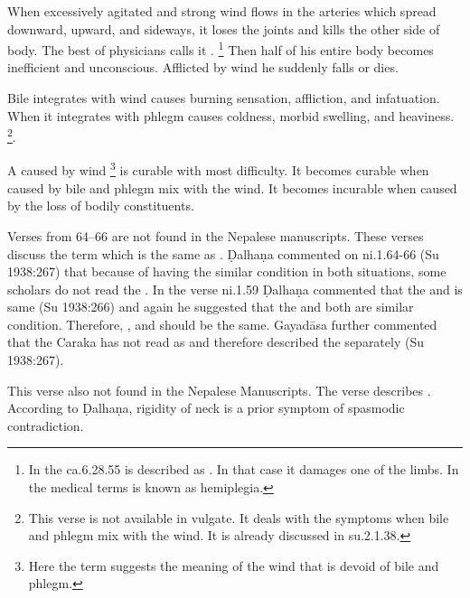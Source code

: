 \begin{translation}
\item[60--62]

	When excessively agitated and strong wind flows in the arteries which
	spread downward, upward, and sideways, it loses the joints and kills the
	other side of body. The best of physicians calls it
	.  \footnote{In the ca.6.28.55 
	is described as . In that case it damages one
	of the limbs.  In the medical terms  is known
	as hemiplegia.} Then half of his entire body becomes inefficient and
	unconscious. Afflicted by wind he suddenly falls or dies.

\item[62.1]

	Bile integrates with wind causes burning sensation, affliction, and
	infatuation. When it integrates with phlegm causes coldness, morbid
	swelling, and heaviness. \footnote{This verse is not available in
	vulgate. It deals with the symptoms when bile and phlegm mix with the
	wind. It is already discussed in su.2.1.38.}. 

\item[63]

	A  caused by wind \footnote{Here the term
	 suggests the meaning of the wind that is devoid of bile and
	phlegm.} is curable with most difficulty. It becomes curable when caused
	by bile and phlegm mix with the wind. It becomes incurable when caused
	by the loss of bodily constituents.

\item[64--66]

	Verses from 64--66 are not found in the Nepalese manuscripts.  These
	verses discuss the term  which
	is the same as . Ḍalhaṇa commented on ni.1.64-66 (Su
	1938:267) that because of having the similar condition in both
	situations, some scholars do not read the . In the verse
	ni.1.59 Ḍalhaṇa commented that the  and  is same
	(Su 1938:266) and again he suggested that the  and
	 both are similar condition. Therefore, ,
	 and  should be the same. Gayadāsa further
	commented that the Caraka has not read  as  and
	therefore described the  separately (Su 1938:267).

\item[67]

	This verse also not found in the Nepalese Manuscripts. The verse
	describes . According to Ḍalhaṇa,
	rigidity of neck is a prior symptom of spasmodic contradiction. 


\end{translation}
